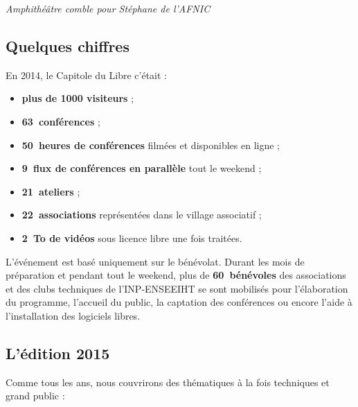 \begin{center}
\textit{Amphithéâtre comble pour Stéphane  de l'AFNIC}
\end{center}

\subsection{Quelques chiffres}

\begin{minipage}{0.6\textwidth}
En 2014, le Capitole du Libre c'était :
\begin{itemize}[label=$\bullet$]
\item \textbf{plus de \num{1000} visiteurs} ;
\item \textbf{63~conférences} ;
\item \textbf{50~heures de conférences} filmées et disponibles en ligne ;
\item \textbf{9~flux de conférences en parallèle} tout le weekend ;
\item \textbf{21~ateliers} ;
\item \textbf{22~associations} représentées dans le village associatif ;
\item \textbf{\SI{2}{\tera o} de vidéos} sous licence libre une fois traitées.
\end{itemize}
\end{minipage}
\begin{minipage}{0.4\textwidth}
\begin{center}
\end{center}
\end{minipage}

\Separateur

L’événement est basé uniquement sur le bénévolat.
 Durant les mois de préparation et pendant tout le weekend,
 plus de \textbf{60~bénévoles} des associations et des clubs techniques
 de l’INP-ENSEEIHT se sont mobilisés pour l’élaboration du programme,
 l’accueil du public, la captation des conférences ou encore l’aide
 à l’installation des logiciels libres.


\subsection{L'édition 2015}

Comme tous les ans, nous couvrirons des thématiques à la fois techniques et grand 
public :

